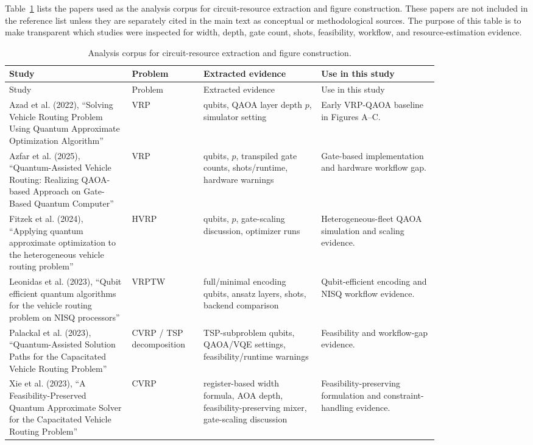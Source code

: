 \label{app:analysis-corpus}

Table~\ref{tab:analysis-corpus-appendix} lists the papers used as the analysis corpus for circuit-resource extraction and figure construction.
These papers are not included in the reference list unless they are separately cited in the main text as conceptual or methodological sources.
The purpose of this table is to make transparent which studies were inspected for width, depth, gate count, shots, feasibility, workflow, and resource-estimation evidence.

\small
\begin{longtable}{p{0.24\linewidth}p{0.12\linewidth}p{0.23\linewidth}p{0.23\linewidth}}
\caption{Analysis corpus for circuit-resource extraction and figure construction.}
\label{tab:analysis-corpus-appendix}\\
\toprule
Study & Problem & Extracted evidence & Use in this study \\
\midrule
\endfirsthead
\toprule
Study & Problem & Extracted evidence & Use in this study \\
\midrule
\endhead
Azad et al. (2022), ``Solving Vehicle Routing Problem Using Quantum Approximate Optimization Algorithm'' & VRP & qubits, QAOA layer depth $p$, simulator setting & Early VRP-QAOA baseline in Figures A--C. \\
Azfar et al. (2025), ``Quantum-Assisted Vehicle Routing: Realizing QAOA-based Approach on Gate-Based Quantum Computer'' & VRP & qubits, $p$, transpiled gate counts, shots/runtime, hardware warnings & Gate-based implementation and hardware workflow gap. \\
Fitzek et al. (2024), ``Applying quantum approximate optimization to the heterogeneous vehicle routing problem'' & HVRP & qubits, $p$, gate-scaling discussion, optimizer runs & Heterogeneous-fleet QAOA simulation and scaling evidence. \\
Leonidas et al. (2023), ``Qubit efficient quantum algorithms for the vehicle routing problem on NISQ processors'' & VRPTW & full/minimal encoding qubits, ansatz layers, shots, backend comparison & Qubit-efficient encoding and NISQ workflow evidence. \\
Palackal et al. (2023), ``Quantum-Assisted Solution Paths for the Capacitated Vehicle Routing Problem'' & CVRP / TSP decomposition & TSP-subproblem qubits, QAOA/VQE settings, feasibility/runtime warnings & Feasibility and workflow-gap evidence. \\
Xie et al. (2023), ``A Feasibility-Preserved Quantum Approximate Solver for the Capacitated Vehicle Routing Problem'' & CVRP & register-based width formula, AOA depth, feasibility-preserving mixer, gate-scaling discussion & Feasibility-preserving formulation and constraint-handling evidence. \\

\end{longtable}
